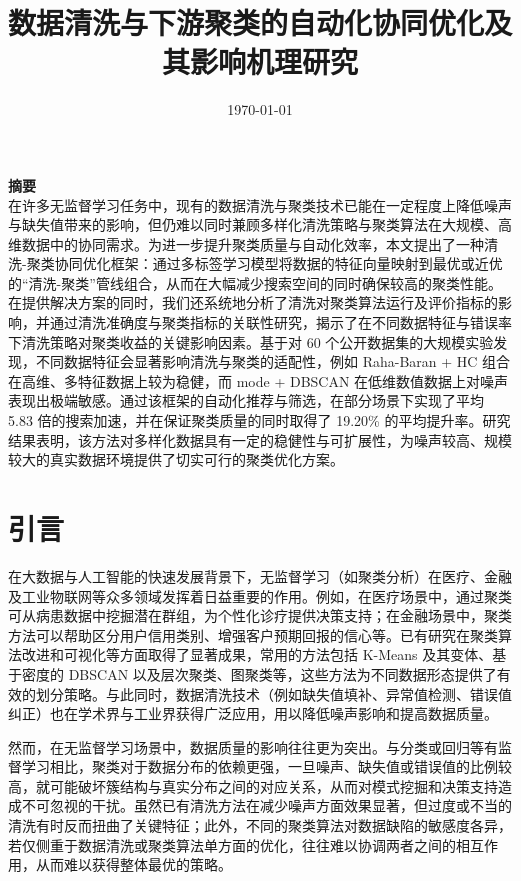 \documentclass[10pt]{article} %
\numberwithin{equation}{section}
\begin{document}
\title{\textbf{数据清洗与下游聚类的自动化协同优化及其影响机理研究}}
\date{\today}
\maketitle

\noindent\textbf{\large 摘要}\\
在许多无监督学习任务中，现有的数据清洗与聚类技术已能在一定程度上降低噪声与缺失值带来的影响，但仍难以同时兼顾多样化清洗策略与聚类算法在大规模、高维数据中的协同需求。为进一步提升聚类质量与自动化效率，本文提出了一种清洗-聚类协同优化框架：通过多标签学习模型将数据的特征向量映射到最优或近优的“清洗-聚类”管线组合，从而在大幅减少搜索空间的同时确保较高的聚类性能。在提供解决方案的同时，我们还系统地分析了清洗对聚类算法运行及评价指标的影响，并通过清洗准确度与聚类指标的关联性研究，揭示了在不同数据特征与错误率下清洗策略对聚类收益的关键影响因素。基于对 60 个公开数据集的大规模实验发现，不同数据特征会显著影响清洗与聚类的适配性，例如 Raha-Baran + HC 组合在高维、多特征数据上较为稳健，而 mode + DBSCAN 在低维数值数据上对噪声表现出极端敏感。通过该框架的自动化推荐与筛选，在部分场景下实现了平均 5.83 倍的搜索加速，并在保证聚类质量的同时取得了 19.20\% 的平均提升率。研究结果表明，该方法对多样化数据具有一定的稳健性与可扩展性，为噪声较高、规模较大的真实数据环境提供了切实可行的聚类优化方案。


\section{引言}

在大数据与人工智能的快速发展背景下，无监督学习（如聚类分析）在医疗、金融及工业物联网等众多领域发挥着日益重要的作用\cite{Aljohani2024, 10729915, Passlick2021}。例如，在医疗场景中，通过聚类可从病患数据中挖掘潜在群组，为个性化诊疗提供决策支持\cite{10.1007/978-3-031-72506-731}；在金融场景中，聚类方法可以帮助区分用户信用类别、增强客户预期回报的信心等\cite{Cai2016}。已有研究在聚类算法改进和可视化等方面取得了显著成果，常用的方法包括 K-Means 及其变体\cite{Bandyapadhyay2024}、基于密度的 DBSCAN 以及层次聚类、图聚类\cite{10.1145/3299876}等，这些方法为不同数据形态提供了有效的划分策略。与此同时，数据清洗技术（例如缺失值填补、异常值检测、错误值纠正）也在学术界与工业界获得广泛应用，用以降低噪声影响和提高数据质量\cite{10.1145/2723372.2749431, 10.1145/2463676.2465327, Rekatsinas2017}。

然而，在无监督学习场景中，数据质量的影响往往更为突出。与分类或回归等有监督学习相比，聚类对于数据分布的依赖更强，一旦噪声、缺失值或错误值的比例较高，就可能破坏簇结构与真实分布之间的对应关系\cite{ALAM2023100341}，从而对模式挖掘和决策支持造成不可忽视的干扰。虽然已有清洗方法在减少噪声方面效果显著，但过度或不当的清洗有时反而扭曲了关键特征\cite{Ni2023}；此外，不同的聚类算法对数据缺陷的敏感度各异\cite{SINGH2024102799}，若仅侧重于数据清洗或聚类算法单方面的优化，往往难以协调两者之间的相互作用，从而难以获得整体最优的策略。
\end{document}
